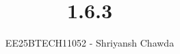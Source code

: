 \documentclass[journal]{IEEEtran}
\begin{document}
	
	
	\vspace{3cm}
	
	\title{1.6.3}
	\author{EE25BTECH11052 - Shriyansh Chawda}
	\maketitle
	{\let\newpage\relax\maketitle}
	
	\renewcommand{\thefigure}{\theenumi}
	\renewcommand{\thetable}{\theenumi}
	\setlength{\intextsep}{10pt} %
	
	
	\renewcommand{\thetable}{\theenumi}
	
\end{document}
